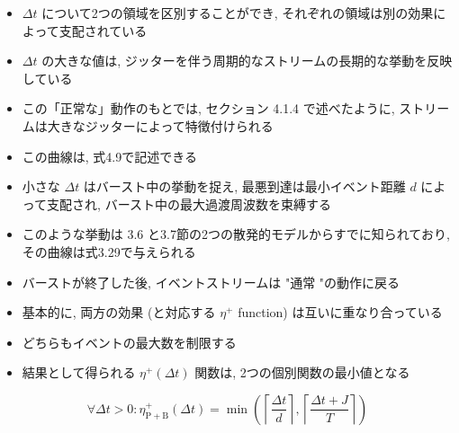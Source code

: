\begin{frame}{}
    \begin{itemize}
        \item $\Delta t$ について2つの領域を区別することができ, それぞれの領域は別の効果によって支配されている
        \item $\Delta t$ の大きな値は, ジッターを伴う周期的なストリームの長期的な挙動を反映している
        \item この「正常な」動作のもとでは, セクション 4.1.4 で述べたように, ストリームは大きなジッターによって特徴付けられる
        \item この曲線は, 式4.9で記述できる

        \item 小さな $\Delta t$ はバースト中の挙動を捉え, 最悪到達は最小イベント距離 $d$ によって支配され, バースト中の最大過渡周波数を束縛する
        \item このような挙動は $3.6$ と3.7節の2つの散発的モデルからすでに知られており, その曲線は式3.29で与えられる
        \item バーストが終了した後, イベントストリームは "通常 "の動作に戻る

        \item 基本的に, 両方の効果 (と対応する $\eta^{+}$ function) は互いに重なり合っている
        \item どちらもイベントの最大数を制限する
    \end{itemize}
\end{frame}

\begin{frame}{}
    \begin{itemize}
        \item 結果として得られる $\eta^{+}(\Delta t)$ 関数は, 2つの個別関数の最小値となる

    \end{itemize}
    \begin{equation*}
        \forall \Delta t>0: \eta_{\mathrm{P}+\mathrm{B}}^{+}(\Delta t)=\min \left(\left\lceil\frac{\Delta t}{d}\right\rceil,\left\lceil\frac{\Delta t+J}{T}\right\rceil\right)
    \end{equation*}
\end{frame}

